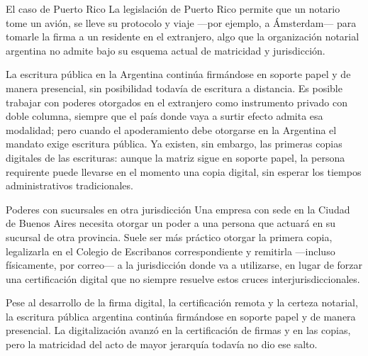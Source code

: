 \documentclass[12pt,oneside]{book}
\begin{document}
\begin{example}{El caso de Puerto Rico}
La legislación de Puerto Rico permite que un notario tome un avión, se lleve su protocolo y viaje ---por ejemplo, a Ámsterdam--- para tomarle la firma a un residente en el extranjero, algo que la organización notarial argentina no admite bajo su esquema actual de matricidad y jurisdicción.
\end{example}

La escritura pública en la Argentina continúa firmándose en soporte papel y de manera presencial, sin posibilidad todavía de escritura a distancia. Es posible trabajar con poderes otorgados en el extranjero como instrumento privado con doble columna, siempre que el país donde vaya a surtir efecto admita esa modalidad; pero cuando el apoderamiento debe otorgarse en la Argentina el mandato exige escritura pública. Ya existen, sin embargo, las primeras copias digitales de las escrituras: aunque la matriz sigue en soporte papel, la persona requirente puede llevarse en el momento una copia digital, sin esperar los tiempos administrativos tradicionales.

\begin{example}{Poderes con sucursales en otra jurisdicción}
Una empresa con sede en la Ciudad de Buenos Aires necesita otorgar un poder a una persona que actuará en su sucursal de otra provincia. Suele ser más práctico otorgar la primera copia, legalizarla en el Colegio de Escribanos correspondiente y remitirla ---incluso físicamente, por correo--- a la jurisdicción donde va a utilizarse, en lugar de forzar una certificación digital que no siempre resuelve estos cruces interjurisdiccionales.
\end{example}

\begin{important}
Pese al desarrollo de la firma digital, la certificación remota y la certeza notarial, la escritura pública argentina continúa firmándose en soporte papel y de manera presencial. La digitalización avanzó en la certificación de firmas y en las copias, pero la matricidad del acto de mayor jerarquía todavía no dio ese salto.
\end{important}
\end{document}
